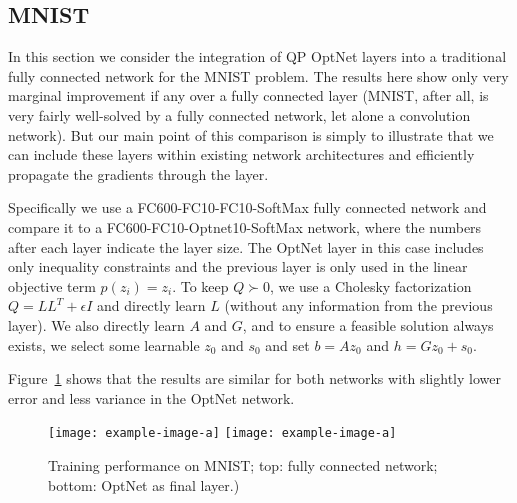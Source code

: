 \subsection{MNIST}
\label{sec:optnet:mnist}
In this section we consider the integration of QP OptNet layers into a traditional
fully connected network for the MNIST problem.  The results here show only very
marginal improvement if any over a fully connected layer (MNIST, after all, is
very fairly well-solved by a fully connected network, let alone a convolution
network). But our main point of this comparison is simply to illustrate that we
can include these layers within existing network architectures and efficiently
propagate the gradients through the layer.

Specifically we use a
FC600-FC10-FC10-SoftMax fully connected network and compare it to a
FC600-FC10-Optnet10-SoftMax network, where the numbers after each layer indicate
the layer size.
The OptNet layer in this case includes only inequality constraints and
the previous layer is only used in the linear objective term $p(z_i)=z_i$.
To keep $Q\succ 0$, we use a Cholesky factorization $Q=LL^T+\epsilon I$
and directly learn $L$ (without any information from the previous layer).
We also directly learn $A$ and $G$, and to ensure a feasible solution
always exists, we select some learnable $z_0$ and $s_0$ and set
$b=A z_0$ and $h=Gz_0+s_0$.

Figure~\ref{fig:mnist} shows that the results are similar for
both networks with slightly lower error and less variance in
the OptNet network.

\begin{figure}[h]
    \centering
    \texttt{[image: example-image-a]}
    \texttt{[image: example-image-a]}
    \caption{Training performance on MNIST; top: fully connected network;
        bottom: OptNet as final layer.)}
    \label{fig:mnist}
\end{figure}



